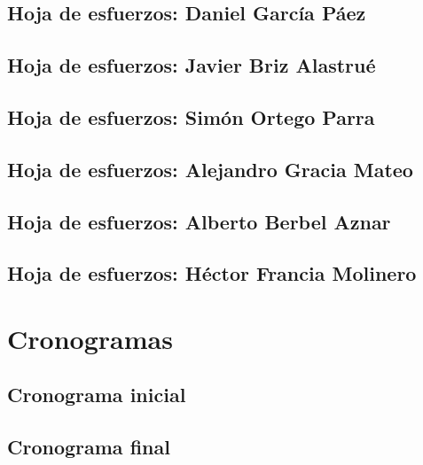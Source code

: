 \documentclass[10pt,spanish]{article}
\begin{document}
\subsection{Hoja de esfuerzos: Daniel García Páez}

\blindtext
\subsection{Hoja de esfuerzos: Javier Briz Alastrué}

\blindtext
\subsection{Hoja de esfuerzos: Simón Ortego Parra}

\blindtext
\subsection{Hoja de esfuerzos: Alejandro Gracia Mateo}

\blindtext
\subsection{Hoja de esfuerzos: Alberto Berbel Aznar}

\blindtext
\subsection{Hoja de esfuerzos: Héctor Francia Molinero}

\blindtext

\section{Cronogramas}

\blindtext
\subsection{Cronograma inicial}

\blindtext
\subsection{Cronograma final}

\blindtext
\end{document}
